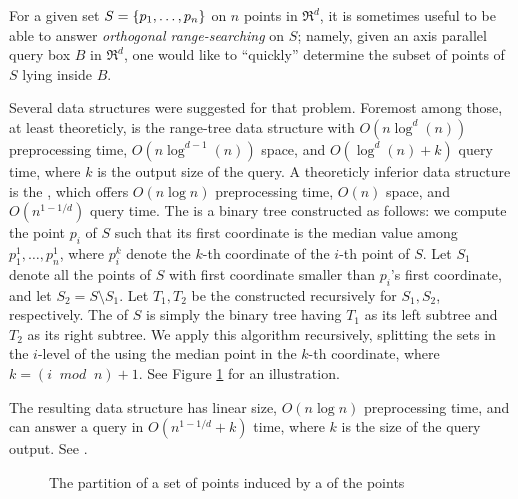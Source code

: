 
For a given set $S = \left\{ { p_1, \ldots, p_n } \right\}$ on $n$ points in
$\Re^d$, it is sometimes useful to be able to answer {\em orthogonal
   range-searching} on $S$; namely, given an axis parallel query box
$B$ in $\Re^d$, one would like to ``quickly'' determine the subset of
points of $S$ lying inside $B$.





Several data structures were suggested for that problem. 
Foremost among those, at least theoreticly, is the range-tree data structure
with $O(n \log^d{(n)})$ preprocessing time, $O(n\log^{d-1}(n))$ space,
and $O(\log^{d}(n) + k)$ query time, where $k$ is the output size of
the query.
A theoreticly inferior data structure is the \kdt, which offers $O(n
\log{n})$ preprocessing time, $O(n)$ space, and $O(n^{1-1/d})$ query
time. The {\kdt}  is a binary tree constructed as follows: we compute
the point $p_i$ of $S$ such that its first coordinate is the median
value among $p_1^1, \ldots, p_n^1$, where $p_i^k$ denote the $k$-th
coordinate of the $i$-th point of $S$. Let $S_1$ denote all the points
of $S$ with first coordinate smaller than $p_i$'s first coordinate, and
let $S_2 = S \setminus S_1$.  Let $T_1,T_2$ be the {\kdts}  constructed
recursively for $S_1, S_2$, respectively.  The {\kdt}  of $S$ is simply
the binary tree having $T_1$ as its left subtree and $T_2$ as its
right subtree. We apply this algorithm recursively, splitting the sets
in the $i$-level of the {\kdt}  using the median point in the $k$-th
coordinate, where $k=(i \;\;mod \;\;n) + 1$. See Figure
\ref{KDT_fig:kdtree} for an illustration.

The resulting data structure has linear size, $O(n\log{n})$
preprocessing time, and can answer a query in $O(n^{1-1/d} +k)$ time,
where $k$ is the size of the query output. See \cite{bkos-cgaa-97}.

\begin{ccTexOnly}

\begin{figure}[hb]
    \begin{center}
    \end{center}

    \caption{The partition of a set of  points induced by a  
       {\kdt}  of the points}

    \label{KDT_fig:kdtree}
\end{figure}

\end{ccTexOnly}

